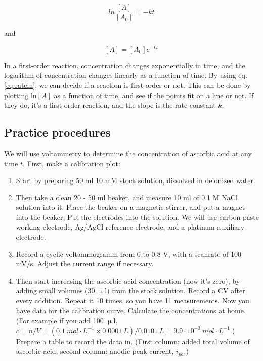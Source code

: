\begin{equation}
\label{eq:rate}
        ln
	\frac{[A]}{[A_0]}
        =
        -kt
\end{equation}

and

\begin{equation}
\label{eq:rateln}
        [A]
	=
	[A_0]
	e^{-kt}
\end{equation}

In a first-order reaction, concentration changes exponentially in time, and the logarithm of concentration changes linearly as a function of time. By using eq. \ref{eq:rateln}, we can decide if a reaction is first-order or not. This can be done by plotting ln$[A]$ as a function of time, and see if the points fit on a line or not. If they do, it's a first-order reaction, and the slope is the rate constant $k$.

\subsection{Practice procedures}
We will use voltammetry to determine the concentration of ascorbic acid at any time $t$. First, make a calibration plot:

\begin{enumerate}
\item Start by preparing 50 ml 10 mM stock solution, dissolved in deionized water.

\item Then take a clean 20 - 50 ml beaker, and measure 10 ml of 0.1 M NaCl solution into it. Place the beaker on a magnetic stirrer, and put a magnet into the beaker. Put the electrodes into the solution. We will use carbon paste working electrode, Ag/AgCl reference electrode, and a platinum auxiliary electrode.

\item Record a cyclic voltammogramm from 0 to 0.8 V, with a scanrate of 100 mV/s. Adjust the current range if necessary.

\item Then start increasing the ascorbic acid concentration (now it's zero), by adding small volumes (30 $\upmu$l) from the stock solution. Record a CV after every addition. Repeat it 10 times, so you have 11 measurements. Now you have data for the calibration curve. Calculate the concentrations at home. (For example if you add 100 $\upmu$l, $c = n/V = (0.1~mol\cdot L^{-1} \times 0.0001~L) / 0.0101~L = 9.9\cdot10^{-3}~mol\cdot L^{-1}$.) Prepare a table to record the data in. (First column: added total volume of ascorbic acid, second column: anodic peak current, $i_{pa}$.)
\end{enumerate}

